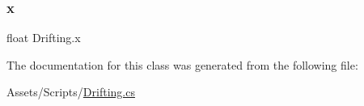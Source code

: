 \mbox{\label{classDrifting_a27b6a1856b5db697632db9b4b82ef091}} 
\subsubsection{\texorpdfstring{x}{x}}
{\footnotesize\ttfamily float Drifting.\+x}



The documentation for this class was generated from the following file\+:\begin{DoxyCompactItemize}
\item 
Assets/\+Scripts/\hyperlink{Drifting_8cs}{Drifting.\+cs}\end{DoxyCompactItemize}
